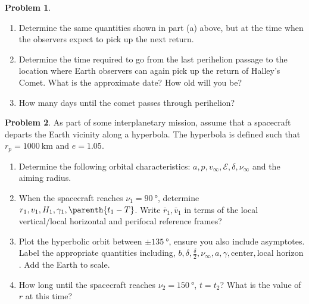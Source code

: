 \documentclass[10pt]{article}
\theoremstyle{definition}
\newtheorem{prob}{Problem}[section]
\newenvironment{subprob}%
{\renewcommand{\theenumi}{\alph{enumi}}\renewcommand{\labelenumi}{(\theenumi)}\begin{enumerate}}%
{\end{enumerate}}%
\begin{document}
\begin{prob}
\begin{subprob}
    You can check the path of 1P/Halley at the JPL Small-Body Data Browser by going to the following \href{https://ssd.jpl.nasa.gov/sbdb.cgi?ID=c00001_0}{link}.
        Observers on Earth can pick up the comet when its true anomaly is approximately \SI{100}{\degree} prior perihelion.

    \item Determine the same quantities shown in part (a) above, but at the time when the observers expect to pick up the next return.
    \item Determine the time required to go from the last perihelion passage to the location where Earth observers can again pick up the return of Halley's Comet.
        What is the approximate date?
        How old will you be?
    \item How many days until the comet passes through perihelion?
    \end{subprob}
\end{prob}

\clearpage\newpage
\begin{prob}
    As part of some interplanetary mission, assume that a spacecraft departs the Earth vicinity along a hyperbola.
    The hyperbola is defined such that \( r_p = \SI{1000}{\kilo\meter} \) and \( e  = 1.05\).

    \begin{subprob}
        \item Determine the following orbital characteristics: \( a, p, v_\infty, \mathcal{E}, \delta, \nu_\infty \) and the aiming radius.
        \item When the spacecraft reaches \( \nu_1 = \SI{90}{\degree} \), determine \( r_1, v_1, H_1, \gamma_1, \parenth{t_1 - T } \).
            Write \( \bar r_1, \bar v_1 \) in terms of the local vertical/local horizontal and perifocal reference frames?
        \item Plot the hyperbolic orbit between \( \pm \SI{135}{\degree} \), ensure you also include asymptotes.
            Label the appropriate quantities including, \( b, \delta, \frac{\delta}{2} , \nu_\infty, a, \gamma, \text{center} , \text{local horizon} \).
            Add the Earth to scale.
        \item How long until the spacecraft reaches \( \nu_2 = \SI{150}{\degree} \), \( t = t_2\)?
            What is the value of \( r \) at this time?
    \end{subprob}
\end{prob}
\end{document}
